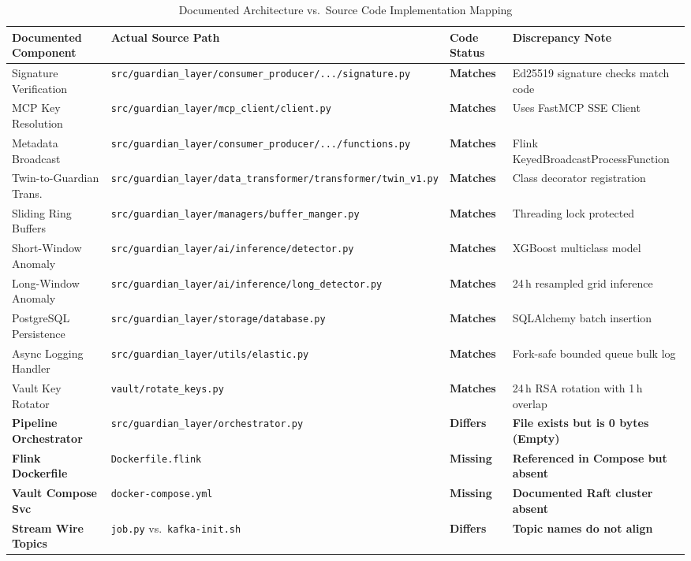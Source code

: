 \documentclass[10pt,a4paper]{report}
\begin{document}
\begin{table}[htbp]
\centering
\small
\caption{Documented Architecture vs.\ Source Code Implementation Mapping}
\label{tab:mapping_verification}
\begin{tabularx}{\textwidth}{lXll}
\toprule
\textbf{Documented Component} & \textbf{Actual Source Path} & \textbf{Code Status} & \textbf{Discrepancy Note} \\
\midrule
Signature Verification & \texttt{src/guardian\_layer/consumer\_producer/.../signature.py} & \textbf{Matches} & Ed25519 signature checks match code \\
MCP Key Resolution & \texttt{src/guardian\_layer/mcp\_client/client.py} & \textbf{Matches} & Uses FastMCP SSE Client \\
Metadata Broadcast & \texttt{src/guardian\_layer/consumer\_producer/.../functions.py} & \textbf{Matches} & Flink KeyedBroadcastProcessFunction \\
Twin-to-Guardian Trans. & \texttt{src/guardian\_layer/data\_transformer/transformer/twin\_v1.py} & \textbf{Matches} & Class decorator registration \\
Sliding Ring Buffers & \texttt{src/guardian\_layer/managers/buffer\_manger.py} & \textbf{Matches} & Threading lock protected \\
Short-Window Anomaly & \texttt{src/guardian\_layer/ai/inference/detector.py} & \textbf{Matches} & XGBoost multiclass model \\
Long-Window Anomaly & \texttt{src/guardian\_layer/ai/inference/long\_detector.py} & \textbf{Matches} & 24\,h resampled grid inference \\
PostgreSQL Persistence & \texttt{src/guardian\_layer/storage/database.py} & \textbf{Matches} & SQLAlchemy batch insertion \\
Async Logging Handler & \texttt{src/guardian\_layer/utils/elastic.py} & \textbf{Matches} & Fork-safe bounded queue bulk log \\
Vault Key Rotator & \texttt{vault/rotate\_keys.py} & \textbf{Matches} & 24\,h RSA rotation with 1\,h overlap \\
\textbf{Pipeline Orchestrator} & \texttt{src/guardian\_layer/orchestrator.py} & \textbf{Differs} & \textbf{File exists but is 0 bytes (Empty)} \\
\textbf{Flink Dockerfile} & \texttt{Dockerfile.flink} & \textbf{Missing} & \textbf{Referenced in Compose but absent} \\
\textbf{Vault Compose Svc} & \texttt{docker-compose.yml} & \textbf{Missing} & \textbf{Documented Raft cluster absent} \\
\textbf{Stream Wire Topics} & \texttt{job.py} vs.\ \texttt{kafka-init.sh} & \textbf{Differs} & \textbf{Topic names do not align} \\
\bottomrule
\end{tabularx}
\end{table}
\end{document}
